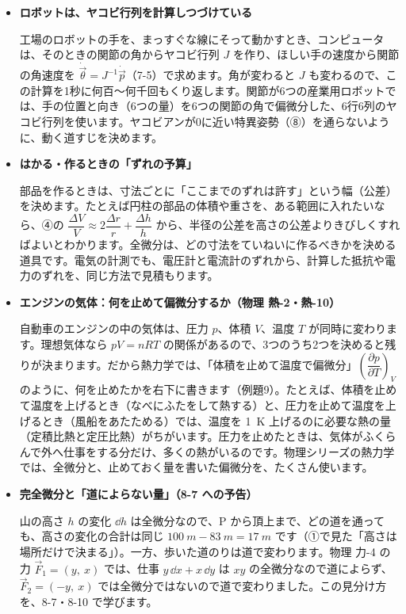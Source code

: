 \begin{butsuri}
\begin{itemize}[leftmargin=1.2\zw, itemsep=3pt, topsep=0pt, label={\color{bkPurple}●}]
\item \textbf{ロボットは、ヤコビ行列を計算しつづけている}\par\noindent 工場のロボットの手を、まっすぐな線にそって動かすとき、コンピュータは、そのときの関節の角からヤコビ行列 $J$ を作り、ほしい手の速度から関節の角速度を $\dot{\vec\theta}=J^{-1}\dot{\vec p}$（7-5）で求めます。角が変わると $J$ も変わるので、この計算を1秒に何百〜何千回もくり返します。関節が6つの産業用ロボットでは、手の位置と向き（6つの量）を6つの関節の角で偏微分した、6行6列のヤコビ行列を使います。ヤコビアンが0に近い特異姿勢（⑧）を通らないように、動く道すじを決めます。
\item \textbf{はかる・作るときの「ずれの予算」}\par\noindent 部品を作るときは、寸法ごとに「ここまでのずれは許す」という幅（公差）を決めます。たとえば円柱の部品の体積や重さを、ある範囲に入れたいなら、④の $\dfrac{\Delta V}{V}\approx2\dfrac{\Delta r}{r}+\dfrac{\Delta h}{h}$ から、半径の公差を高さの公差よりきびしくすればよいとわかります。全微分は、どの寸法をていねいに作るべきかを決める道具です。電気の計測でも、電圧計と電流計のずれから、計算した抵抗や電力のずれを、同じ方法で見積もります。
\end{itemize}
\end{butsuri}

\begin{butsuri}
\begin{itemize}[leftmargin=1.2\zw, itemsep=3pt, topsep=0pt, label={\color{bkPurple}●}]
\item \textbf{エンジンの気体：何を止めて偏微分するか（物理 熱-2・熱-10）}\par\noindent 自動車のエンジンの中の気体は、圧力 $p$、体積 $V$、温度 $T$ が同時に変わります。理想気体なら $pV=nRT$ の関係があるので、3つのうち2つを決めると残りが決まります。だから熱力学では、「体積を止めて温度で偏微分」$\left(\dfrac{\partial p}{\partial T}\right)_V$ のように、何を止めたかを右下に書きます（例題9）。たとえば、体積を止めて温度を上げるとき（なべにふたをして熱する）と、圧力を止めて温度を上げるとき（風船をあたためる）では、温度を \qty{1}{K} 上げるのに必要な熱の量（定積比熱と定圧比熱）がちがいます。圧力を止めたときは、気体がふくらんで外へ仕事をする分だけ、多くの熱がいるのです。物理シリーズの熱力学では、全微分と、止めておく量を書いた偏微分を、たくさん使います。
\item \textbf{完全微分と「道によらない量」（8-7 への予告）}\par\noindent 山の高さ $h$ の変化 $\dd h$ は全微分なので、P から頂上まで、どの道を通っても、高さの変化の合計は同じ $\qty{100}{m}-\qty{83}{m}=\qty{17}{m}$ です（①で見た「高さは場所だけで決まる」）。一方、歩いた道のりは道で変わります。物理 力-4 の力 $\vec F_1=(y,\ x)$ では、仕事 $y\,\dd x+x\,\dd y$ は $xy$ の全微分なので道によらず、$\vec F_2=(-y,\ x)$ では全微分ではないので道で変わりました。この見分け方を、8-7・8-10 で学びます。
\end{itemize}
\end{butsuri}

